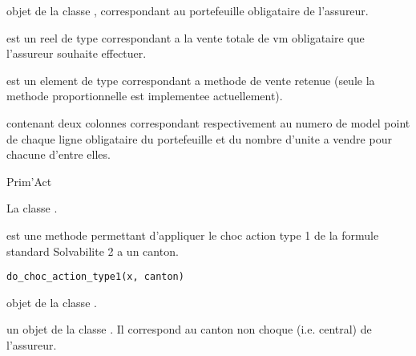 \documentclass[a4paper]{book}
\begin{document}
\begin{Arguments}
\begin{ldescription}
\item[\code{x}] objet de la classe , correspondant au portefeuille obligataire de l'assureur.

\item[\code{montant\_vente}] est un reel de type  correspondant a la vente totale de vm obligataire
que l'assureur souhaite effectuer.

\item[\code{method\_vente}] est un element de type  correspondant a methode de vente retenue
(seule la methode proportionnelle est implementee actuellement).
\end{ldescription}
\end{Arguments}
%
\begin{Value}
 contenant deux colonnes  correspondant respectivement
au numero de model point de chaque ligne obligataire du portefeuille et du nombre d'unite a vendre pour
chacune d'entre elles.
\end{Value}
%
\begin{Author}\relax
Prim'Act
\end{Author}
%
\begin{SeeAlso}\relax
La classe .
\end{SeeAlso}
%
\begin{Description}\relax
{} est une methode permettant d'appliquer le choc action type 1 de la formule standard Solvabilite 2 a un canton.
\end{Description}
%
\begin{Usage}
\begin{verbatim}
do_choc_action_type1(x, canton)
\end{verbatim}
\end{Usage}
%
\begin{Arguments}
\begin{ldescription}
\item[\code{x}] objet de la classe .

\item[\code{canton}] un objet de la classe . Il correspond au canton non choque (i.e. central) de l'assureur.
\end{ldescription}
\end{Arguments}
\end{document}
